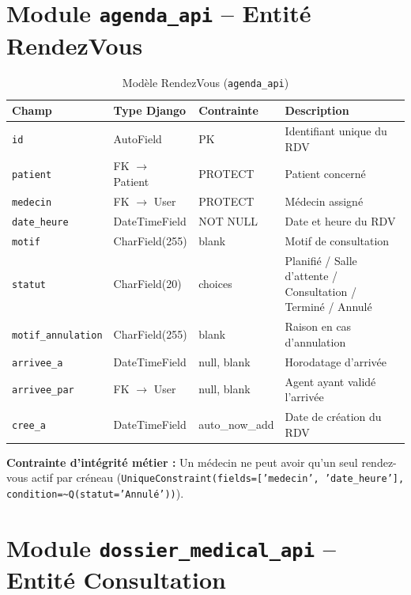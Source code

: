 \documentclass[12pt,a4paper]{report}
\begin{document}
\section{Module \texttt{agenda\_api} -- Entité RendezVous}

\begin{table}[H]
\centering
\caption{Modèle RendezVous (\texttt{agenda\_api})}
\renewcommand{\arraystretch}{1.4}
\begin{tabular}{|p{3.8cm}|p{3.5cm}|p{2.5cm}|p{4.2cm}|}
  \hline
  \rowcolor{medaccent}
  \textbf{Champ} & \textbf{Type Django} & \textbf{Contrainte} & \textbf{Description} \\
  \hline
  \texttt{id} & AutoField & PK & Identifiant unique du RDV \\
  \hline
  \texttt{patient} & FK $\rightarrow$ Patient & PROTECT & Patient concerné \\
  \hline
  \texttt{medecin} & FK $\rightarrow$ User & PROTECT & Médecin assigné \\
  \hline
  \texttt{date\_heure} & DateTimeField & NOT NULL & Date et heure du RDV \\
  \hline
  \texttt{motif} & CharField(255) & blank & Motif de consultation \\
  \hline
  \texttt{statut} & CharField(20) & choices & Planifié / Salle d'attente / Consultation / Terminé / Annulé \\
  \hline
  \texttt{motif\_annulation} & CharField(255) & blank & Raison en cas d'annulation \\
  \hline
  \texttt{arrivee\_a} & DateTimeField & null, blank & Horodatage d'arrivée \\
  \hline
  \texttt{arrivee\_par} & FK $\rightarrow$ User & null, blank & Agent ayant validé l'arrivée \\
  \hline
  \texttt{cree\_a} & DateTimeField & auto\_now\_add & Date de création du RDV \\
  \hline
\end{tabular}
\end{table}

\noindent\textbf{Contrainte d'intégrité métier :} Un médecin ne peut avoir qu'un seul rendez-vous actif par créneau (\texttt{UniqueConstraint(fields=['medecin', 'date\_heure'], condition=\~{}Q(statut='Annulé'))}).

\section{Module \texttt{dossier\_medical\_api} -- Entité Consultation}
\end{document}
